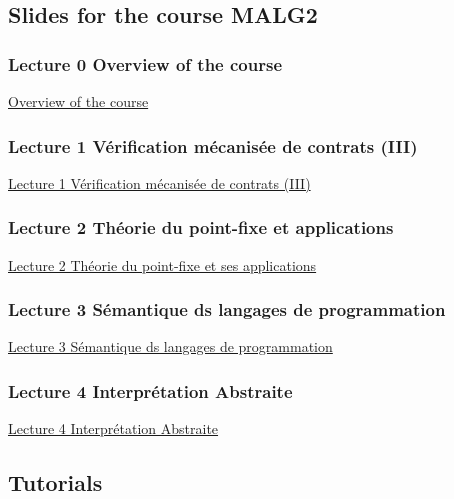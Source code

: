 \documentclass[ 12pt]{article}
\begin{document}
\subsection{Slides for the course MALG2}
\label{sec:slides}


\subsubsection{Lecture 0  {Overview of the course }}
  
  \href{http://mery54.github.io/teaching/movex/lecturesnotes/malglecture0.pdf}{Overview of the course }


   \subsubsection{Lecture 1 {Vérification  mécanisée de contrats} (III)}

   \href{http://mery54.github.io/teaching/movex/lecturesnotes/malglecture1.pdf}{Lecture
     1  Vérification  mécanisée de contrats (III)}


   
   \subsubsection{Lecture 2 {Théorie du point-fixe et applications}}

   \href{http://mery54.github.io/teaching/movex/lecturesnotes/malglecture2.pdf}{Lecture
     2  Théorie du point-fixe et ses applications}
   

   
   \subsubsection{Lecture 3 {Sémantique ds langages de programmation}}

   \href{http://mery54.github.io/teaching/movex/lecturesnotes/malglecture3.pdf}{Lecture
     3 Sémantique ds langages de programmation}
   

   \subsubsection{Lecture 4 {Interprétation Abstraite}}

   \href{http://mery54.github.io/teaching/movex/lecturesnotes/malglecture4.pdf}{Lecture
     4 Interprétation Abstraite}
   


\subsection{Tutorials}
\end{document}
